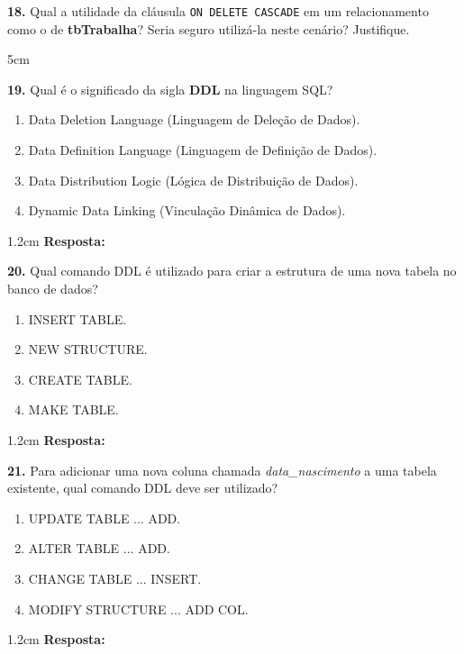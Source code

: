 \documentclass[12pt]{article}
\begin{document}
\vspace{0.5cm}

\textbf{18.} Qual a utilidade da cláusula \texttt{ON DELETE CASCADE} em um relacionamento como o de \textbf{tbTrabalha}? Seria seguro utilizá-la neste cenário? Justifique.
\begin{resposta}{5cm}
\end{resposta}




\vspace{0.4cm}

\textbf{19.} Qual é o significado da sigla \textbf{DDL} na linguagem SQL?
\begin{enumerate}[label=\Alph*)]
  \item Data Deletion Language (Linguagem de Deleção de Dados).
  \item Data Definition Language (Linguagem de Definição de Dados).
  \item Data Distribution Logic (Lógica de Distribuição de Dados).
  \item Dynamic Data Linking (Vinculação Dinâmica de Dados).
\end{enumerate}
\begin{resposta}{1.2cm} \textbf{Resposta:} \end{resposta}

\vspace{0.3cm}

\textbf{20.} Qual comando DDL é utilizado para criar a estrutura de uma nova tabela no banco de dados?
\begin{enumerate}[label=\Alph*)]
  \item INSERT TABLE.
  \item NEW STRUCTURE.
  \item CREATE TABLE.
  \item MAKE TABLE.
\end{enumerate}
\begin{resposta}{1.2cm} \textbf{Resposta:} \end{resposta}

\vspace{0.3cm}

\textbf{21.} Para adicionar uma nova coluna chamada \textit{data\_nascimento} a uma tabela existente, qual comando DDL deve ser utilizado?
\begin{enumerate}[label=\Alph*)]
  \item UPDATE TABLE ... ADD.
  \item ALTER TABLE ... ADD.
  \item CHANGE TABLE ... INSERT.
  \item MODIFY STRUCTURE ... ADD COL.
\end{enumerate}
\begin{resposta}{1.2cm} \textbf{Resposta:} \end{resposta}
\end{document}
